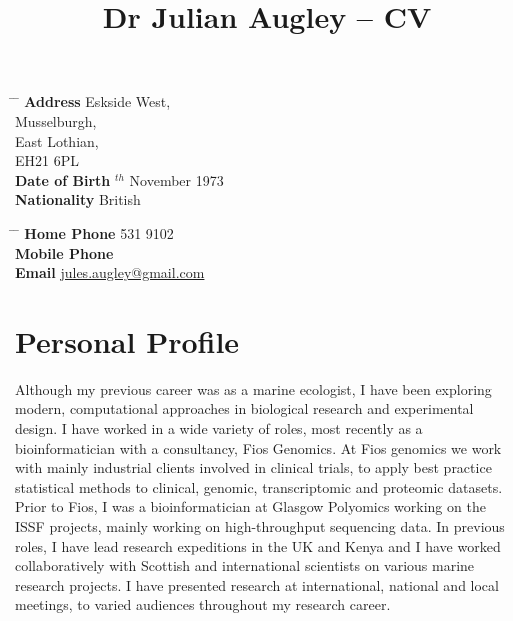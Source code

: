 \documentclass[10pt]{article} %
\begin{document}

\title{Dr Julian Augley -- CV} %


\parbox{0.5\textwidth}{ %
\begin{tabbing} %
\hspace{3cm} \= \hspace{4cm} \= \kill %
{\bf Address}  Eskside West,\\ %
\> Musselburgh, \\ %
\> East Lothian, \\ %
\> EH21 6PL \\ %
{\bf Date of Birth} $^{th}$ November 1973 \\ %
{\bf Nationality} \> British %
\end{tabbing}}
\hfill %
\parbox{0.5\textwidth}{ %
\begin{tabbing} %
\hspace{3cm} \= \hspace{4cm} \= \kill %
{\bf Home Phone}  531 9102 \\ %
{\bf Mobile Phone}  \\ %
{\bf Email} \> \href{mailto:jules.augley@gmail.com}{jules.augley@gmail.com} \\ %
\end{tabbing}}


\section{Personal Profile}

Although my previous career was as a marine ecologist, I have been exploring
modern, computational approaches in biological research and experimental design.
I have worked in a wide variety of roles, most recently as a bioinformatician
with a consultancy, Fios Genomics. At Fios genomics we work with mainly
industrial clients involved in clinical trials, to apply best practice
statistical methods to clinical, genomic, transcriptomic and proteomic datasets.
Prior to Fios, I was a bioinformatician at Glasgow Polyomics working on the ISSF
projects, mainly working on high-throughput sequencing data. In previous roles,
I have lead research expeditions in the UK and Kenya and I have worked
collaboratively with Scottish and international scientists on various marine
research projects. I have presented research at international, national and
local meetings, to varied audiences throughout my research career.
\end{document}
